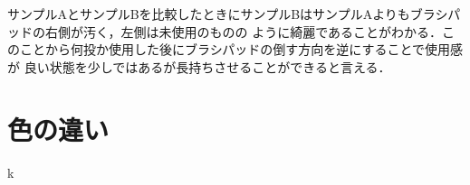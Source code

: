 \documentclass[main]{subfiles}
\begin{document}
サンプルAとサンプルBを比較したときにサンプルBはサンプルAよりもブラシパッドの右側が汚く，左側は未使用のものの
ように綺麗であることがわかる．このことから何投か使用した後にブラシパッドの倒す方向を逆にすることで使用感が
良い状態を少しではあるが長持ちさせることができると言える．
\\

\section{色の違い}

k
\end{document}
